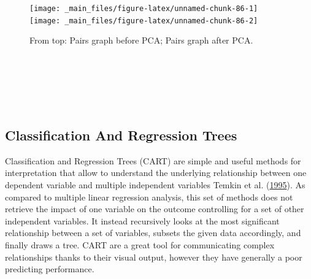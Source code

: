 \documentclass[
]{article}
\newenvironment{Shaded}{\begin{snugshade}}{\end{snugshade}}
\newcommand{\AttributeTok}[1]{\textcolor[rgb]{0.13,0.29,0.53}{#1}}
\newcommand{\CommentTok}[1]{\textcolor[rgb]{0.56,0.35,0.01}{\textit{#1}}}
\newcommand{\FunctionTok}[1]{\textcolor[rgb]{0.13,0.29,0.53}{\textbf{#1}}}
\newcommand{\NormalTok}[1]{#1}
\newcommand{\SpecialCharTok}[1]{\textcolor[rgb]{0.81,0.36,0.00}{\textbf{#1}}}
\newcommand{\StringTok}[1]{\textcolor[rgb]{0.31,0.60,0.02}{#1}}
\begin{document}
\begin{Shaded}
\end{Shaded}

\begin{figure}[H]
\texttt{[image: \_main\_files/figure-latex/unnamed-chunk-86-1]} \texttt{[image: \_main\_files/figure-latex/unnamed-chunk-86-2]} \caption{From top: Pairs graph before PCA; Pairs graph after PCA.}\label{fig:unnamed-chunk-86}
\end{figure}

~

~

~

\hypertarget{classification-and-regression-trees}{%
\subsection{Classification And Regression Trees}\label{classification-and-regression-trees}}

Classification and Regression Trees (CART) are simple and useful methods
for interpretation that allow to understand the underlying relationship
between one dependent variable and multiple independent variables
Temkin et al. (\protect\hyperlink{ref-temkin1995}{1995}). As compared to multiple linear regression
analysis, this set of methods does not retrieve the impact of one
variable on the outcome controlling for a set of other independent
variables. It instead recursively looks at the most significant
relationship between a set of variables, subsets the given data
accordingly, and finally draws a tree. CART are a great tool for
communicating complex relationships thanks to their visual output,
however they have generally a poor predicting performance.
\end{document}
